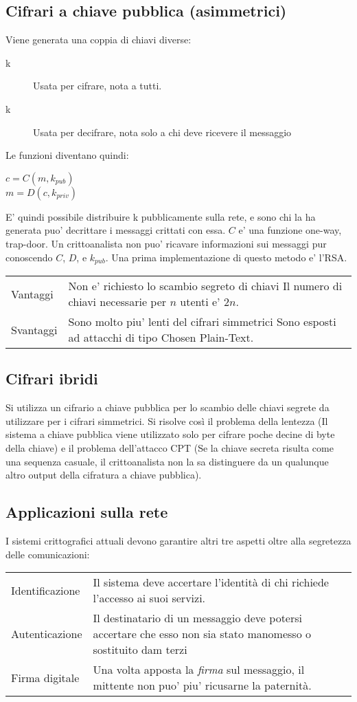 \subsection{Cifrari a chiave pubblica (asimmetrici)}
Viene generata una coppia di chiavi diverse:
\begin{description}
    \item[k] Usata per cifrare, nota a tutti.
    \item[k] Usata per decifrare, nota solo a chi deve ricevere il messaggio
\end{description}
Le funzioni diventano quindi:
\begin{center}
    $c = C(m, k_{pub})$\\
    $m = D(c, k_{priv})$
\end{center}
E' quindi possibile distribuire k pubblicamente sulla rete, e sono chi la ha generata puo' decrittare i messaggi crittati con essa.
$C$ e' una funzione one-way, trap-door.
Un crittoanalista non puo' ricavare informazioni sui messaggi pur conoscendo $C$, $D$, e $k_{pub}$.
Una prima implementazione di questo metodo e' l'RSA.

\begin{tabular}{l | p{20em}}
    Vantaggi & Non e' richiesto lo scambio segreto di chiavi \newline Il numero di chiavi necessarie per $n$ utenti e' $2n$.\\
    Svantaggi & Sono molto piu' lenti del cifrari simmetrici \newline Sono esposti ad attacchi di tipo Chosen Plain-Text.
\end{tabular}
\subsection{Cifrari ibridi}
Si utilizza un cifrario a chiave pubblica per lo scambio delle chiavi segrete da utilizzare per i cifrari simmetrici.
Si risolve così  il problema della lentezza (Il sistema a chiave pubblica viene utilizzato solo per cifrare poche decine di byte della chiave) e il problema dell'attacco CPT (Se la chiave secreta risulta come una sequenza casuale, il crittoanalista non la sa distinguere da un qualunque altro output della cifratura a chiave pubblica).
\subsection{Applicazioni sulla rete}
I sistemi crittografici attuali devono garantire altri tre aspetti oltre alla segretezza delle comunicazioni:
\newline
\newline
\begin{tabular}{l | p{24em}}
    Identificazione & Il sistema deve accertare l'identità di chi richiede l'accesso ai suoi servizi.\\
    Autenticazione & Il destinatario di un messaggio deve potersi accertare che esso non sia stato manomesso o sostituito dam terzi\\
    Firma digitale & Una volta apposta la \textit{firma} sul messaggio, il mittente non puo' piu' ricusarne la paternità.  
\end{tabular}